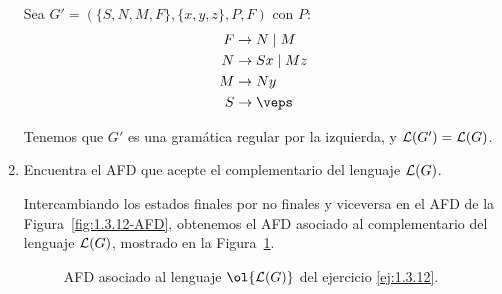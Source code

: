 \begin{ejercicio}
\begin{enumerate}
        Sea $G'=(\{S,N,M, F\},\{x,y,z\},P,F)$ con $P$:
        \begin{align*}
            F & \rightarrow N\mid M\\
            N & \rightarrow Sx \mid Mz\\
            M & \rightarrow Ny\\
            S & \rightarrow \veps
        \end{align*}

        Tenemos que $G'$ es una gramática regular por la izquierda, y $\mathcal{L}(G')=\mathcal{L}(G)$.

        \item Encuentra el AFD que acepte el complementario del lenguaje $\mathcal{L}(G)$.
        
        Intercambiando los estados finales por no finales y viceversa en el AFD de la Figura~\ref{fig:1.3.12-AFD}, obtenemos el AFD asociado al complementario del lenguaje $\mathcal{L}(G)$, mostrado en la Figura~\ref{fig:1.3.12-AFD-Complementario}.
        \begin{figure}
            \centering
            \caption{AFD asociado al lenguaje $\ol{\cc{L}(G)}$ del ejercicio \ref{ej:1.3.12}.}
            \label{fig:1.3.12-AFD-Complementario}
        \end{figure}
    \end{enumerate}
\end{ejercicio}

